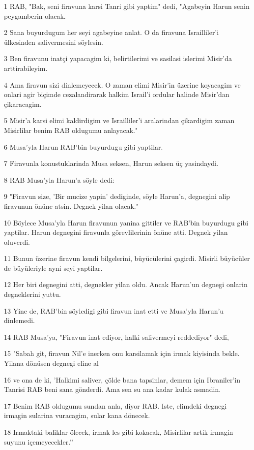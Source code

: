 \par 1 RAB, "Bak, seni firavuna karsi Tanri gibi yaptim" dedi, "Agabeyin Harun senin peygamberin olacak.
\par 2 Sana buyurdugum her seyi agabeyine anlat. O da firavuna Israilliler'i ülkesinden salivermesini söylesin.
\par 3 Ben firavunu inatçi yapacagim ki, belirtilerimi ve sasilasi islerimi Misir'da arttirabileyim.
\par 4 Ama firavun sizi dinlemeyecek. O zaman elimi Misir'in üzerine koyacagim ve onlari agir biçimde cezalandirarak halkim Israil'i ordular halinde Misir'dan çikaracagim.
\par 5 Misir'a karsi elimi kaldirdigim ve Israilliler'i aralarindan çikardigim zaman Misirlilar benim RAB oldugumu anlayacak."
\par 6 Musa'yla Harun RAB'bin buyurdugu gibi yaptilar.
\par 7 Firavunla konustuklarinda Musa seksen, Harun seksen üç yasindaydi.
\par 8 RAB Musa'yla Harun'a söyle dedi:
\par 9 "Firavun size, 'Bir mucize yapin' dediginde, söyle Harun'a, degnegini alip firavunun önüne atsin. Degnek yilan olacak."
\par 10 Böylece Musa'yla Harun firavunun yanina gittiler ve RAB'bin buyurdugu gibi yaptilar. Harun degnegini firavunla görevlilerinin önüne atti. Degnek yilan oluverdi.
\par 11 Bunun üzerine firavun kendi bilgelerini, büyücülerini çagirdi. Misirli büyücüler de büyüleriyle ayni seyi yaptilar.
\par 12 Her biri degnegini atti, degnekler yilan oldu. Ancak Harun'un degnegi onlarin degneklerini yuttu.
\par 13 Yine de, RAB'bin söyledigi gibi firavun inat etti ve Musa'yla Harun'u dinlemedi.
\par 14 RAB Musa'ya, "Firavun inat ediyor, halki salivermeyi reddediyor" dedi,
\par 15 "Sabah git, firavun Nil'e inerken onu karsilamak için irmak kiyisinda bekle. Yilana dönüsen degnegi eline al
\par 16 ve ona de ki, 'Halkimi saliver, çölde bana tapsinlar, demem için Ibraniler'in Tanrisi RAB beni sana gönderdi. Ama sen su ana kadar kulak asmadin.
\par 17 Benim RAB oldugumu sundan anla, diyor RAB. Iste, elimdeki degnegi irmagin sularina vuracagim, sular kana dönecek.
\par 18 Irmaktaki baliklar ölecek, irmak les gibi kokacak, Misirlilar artik irmagin suyunu içemeyecekler.'"
